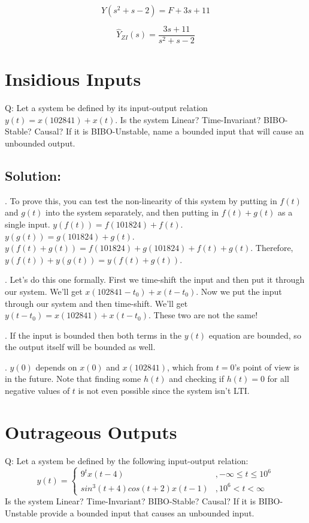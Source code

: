 \documentclass{article}
\begin{document}
$$Y(s^2 + s - 2) = F + 3s + 11$$

$$\boxed{\hat{Y}_{ZI}(s) = \frac{3s + 11}{s^2 + s - 2}}$$

\newpage

\section{Insidious Inputs}

Q: Let a system be defined by its input-output relation $y(t) = x(102841) + x(t)$. Is the system Linear? Time-Invariant? BIBO-Stable? Causal? If it is BIBO-Unstable, name a bounded input that will cause an unbounded output.

\subsection{Solution:}

. To prove this, you can test the non-linearity of this system by putting in $f(t)$ and $g(t)$ into the system separately, and then putting in $f(t)+g(t)$ as a single input.
$y(f(t)) = f(101824) + f(t)$.
$y(g(t)) = g(101824) +g(t)$.
$y(f(t) + g(t)) = f(101824) + g(101824) + f(t) + g(t)$.
Therefore, $y(f(t)) + y(g(t)) = y(f(t) + g(t))$.

. Let's do this one formally. First we time-shift the input and then put it through our system. We'll get $x(102841 - t_0) + x(t - t_0)$. Now we put the input through our system and then time-shift. We'll get $y(t-t_0) = x(102841) + x(t-t_0)$. These two are not the same!

. If the input is bounded then both terms in the $y(t)$ equation are bounded, so the output itself will be bounded as well.

. $y(0)$ depends on $x(0)$ and $x(102841)$, which from $t = 0$'s point of view is in the future. Note that finding some $h(t)$ and checking if $h(t) = 0$ for all negative values of $t$ is not even possible since the system isn't LTI.


\section{Outrageous Outputs}

Q: Let a system be defined by the following input-output relation:
$$y(t) =
    \begin{cases}
      9^t x(t-4) & ,-\infty \leq t \leq 10^6\\
      sin^3(t+4) cos(t+2) x(t-1) & ,10^6 < t < \infty
    \end{cases}$$    
Is the system Linear? Time-Invariant? BIBO-Stable? Causal? If it is BIBO-Unstable provide a bounded input that causes an unbounded input.
\end{document}
